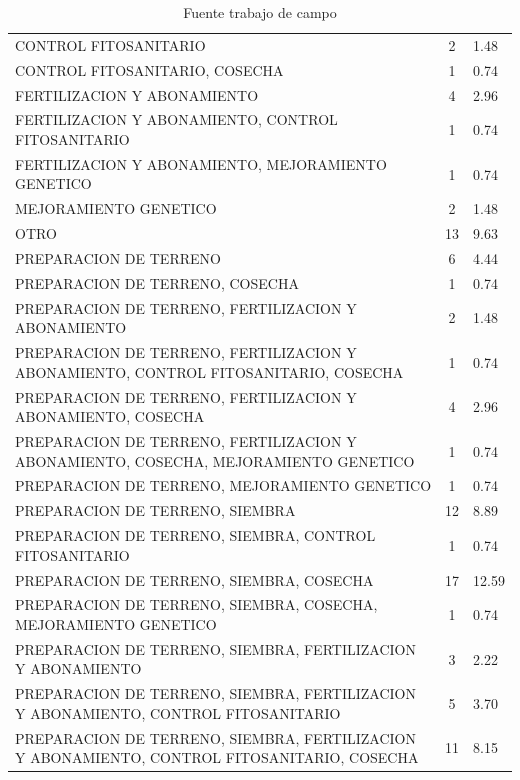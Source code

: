 \documentclass{article}\usepackage[]{graphicx}\usepackage[table]{xcolor}
\newenvironment{tablas}[2]
{\begin{table}[H]
		\centering
		\caption{#1}
		#2
		\caption*{Fuente trabajo de campo}}
	{\end{table}}
\begin{document}
\begin{tablas}
{Temas de capacitacion}{

\begin{tabular}{lcl}
\toprule
\cellcolor[HTML]{87A96B}{\textcolor{black}{\textbf{Temas}}} & \cellcolor[HTML]{87A96B}{\textcolor{black}{\textbf{Conteo}}} & \cellcolor[HTML]{87A96B}{\textcolor{black}{\textbf{Porcentaje}}}\\
\midrule
CONTROL FITOSANITARIO & 2 & 1.48\\
CONTROL FITOSANITARIO, COSECHA & 1 & 0.74\\
FERTILIZACION Y ABONAMIENTO & 4 & 2.96\\
FERTILIZACION Y ABONAMIENTO, CONTROL FITOSANITARIO & 1 & 0.74\\
FERTILIZACION Y ABONAMIENTO, MEJORAMIENTO GENETICO & 1 & 0.74\\
\addlinespace
MEJORAMIENTO GENETICO & 2 & 1.48\\
OTRO & 13 & 9.63\\
PREPARACION DE TERRENO & 6 & 4.44\\
PREPARACION DE TERRENO, COSECHA & 1 & 0.74\\
PREPARACION DE TERRENO, FERTILIZACION Y ABONAMIENTO & 2 & 1.48\\
\addlinespace
PREPARACION DE TERRENO, FERTILIZACION Y ABONAMIENTO, CONTROL FITOSANITARIO, COSECHA & 1 & 0.74\\
PREPARACION DE TERRENO, FERTILIZACION Y ABONAMIENTO, COSECHA & 4 & 2.96\\
PREPARACION DE TERRENO, FERTILIZACION Y ABONAMIENTO, COSECHA, MEJORAMIENTO GENETICO & 1 & 0.74\\
PREPARACION DE TERRENO, MEJORAMIENTO GENETICO & 1 & 0.74\\
PREPARACION DE TERRENO, SIEMBRA & 12 & 8.89\\
\addlinespace
PREPARACION DE TERRENO, SIEMBRA, CONTROL FITOSANITARIO & 1 & 0.74\\
PREPARACION DE TERRENO, SIEMBRA, COSECHA & 17 & 12.59\\
PREPARACION DE TERRENO, SIEMBRA, COSECHA, MEJORAMIENTO GENETICO & 1 & 0.74\\
PREPARACION DE TERRENO, SIEMBRA, FERTILIZACION Y ABONAMIENTO & 3 & 2.22\\
PREPARACION DE TERRENO, SIEMBRA, FERTILIZACION Y ABONAMIENTO, CONTROL FITOSANITARIO & 5 & 3.70\\
\addlinespace
PREPARACION DE TERRENO, SIEMBRA, FERTILIZACION Y ABONAMIENTO, CONTROL FITOSANITARIO, COSECHA & 11 & 8.15\\

\end{tabular}}
\end{tablas}
\end{document}
